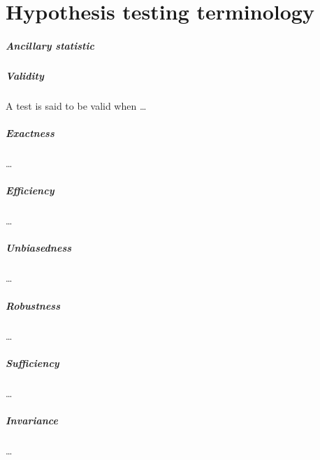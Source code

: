 \chapter{Hypothesis testing terminology}
\label{sec:review}
\setstretch{\lspac}

\paragraph{Ancillary statistic}

\paragraph{Validity} A test is said to be valid when \ldots

\paragraph{Exactness} \ldots

\paragraph{Efficiency} \ldots

\paragraph{Unbiasedness} \ldots

\paragraph{Robustness} \ldots

\paragraph{Sufficiency} \ldots

\paragraph{Invariance} \ldots